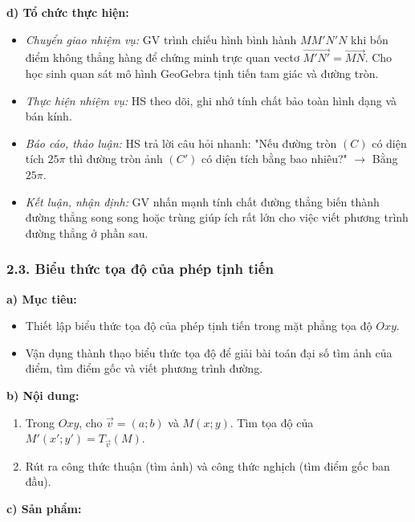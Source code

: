 \documentclass[12pt, a4paper]{article}
\renewcommand{\vec}[1]{\overrightarrow{#1}}
\begin{document}
\noindent \textbf{d) Tổ chức thực hiện:}  
\begin{itemize}[leftmargin=0.8cm]  
    \item \textit{Chuyển giao nhiệm vụ:} GV trình chiếu hình bình hành $MM'N'N$ khi bốn điểm không thẳng hàng để chứng minh trực quan vectơ $\vec{M'N'} = \vec{MN}$. Cho học sinh quan sát mô hình GeoGebra tịnh tiến tam giác và đường tròn.  
    \item \textit{Thực hiện nhiệm vụ:} HS theo dõi, ghi nhớ tính chất bảo toàn hình dạng và bán kính.  
    \item \textit{Báo cáo, thảo luận:} HS trả lời câu hỏi nhanh: "Nếu đường tròn $(C)$ có diện tích $25\pi$ thì đường tròn ảnh $(C')$ có diện tích bằng bao nhiêu?" $\to$ Bằng $25\pi$.  
    \item \textit{Kết luận, nhận định:} GV nhấn mạnh tính chất đường thẳng biến thành đường thẳng song song hoặc trùng giúp ích rất lớn cho việc viết phương trình đường thẳng ở phần sau.  
\end{itemize}  
  
\subsubsection*{2.3. Biểu thức tọa độ của phép tịnh tiến}  
  
\noindent \textbf{a) Mục tiêu:}  
\begin{itemize}[leftmargin=0.8cm]  
    \item Thiết lập biểu thức tọa độ của phép tịnh tiến trong mặt phẳng tọa độ $Oxy$.  
    \item Vận dụng thành thạo biểu thức tọa độ để giải bài toán đại số tìm ảnh của điểm, tìm điểm gốc và viết phương trình đường.  
\end{itemize}  
  
\noindent \textbf{b) Nội dung:}  
\begin{enumerate}[leftmargin=0.6cm]  
    \item Trong $Oxy$, cho $\vec{v} = (a; b)$ và $M(x; y)$. Tìm tọa độ của $M'(x'; y') = T_{\vec{v}}(M)$.  
    \item Rút ra công thức thuận (tìm ảnh) và công thức nghịch (tìm điểm gốc ban đầu).  
\end{enumerate}  
  
\noindent \textbf{c) Sản phẩm:}  
  
\end{document}
